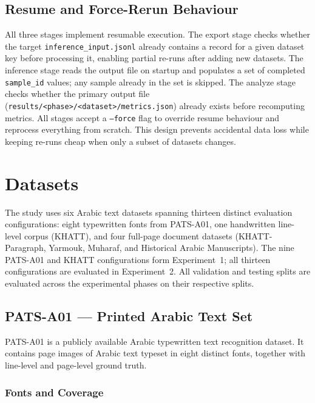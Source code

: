 \subsection{Resume and Force-Rerun Behaviour}
\label{subsec:resume}

All three stages implement resumable execution.
The export stage checks whether the target \texttt{inference\_input.jsonl} already
contains a record for a given dataset key before processing it, enabling partial
re-runs after adding new datasets.
The inference stage reads the output file on startup and populates a set of
completed \texttt{sample\_id} values; any sample already in the set is skipped.
The analyze stage checks whether the primary output file
(\texttt{results/<phase>/<dataset>/metrics.json}) already exists before
recomputing metrics.
All stages accept a \texttt{--force} flag to override resume behaviour and
reprocess everything from scratch.
This design prevents accidental data loss while keeping re-runs cheap when only
a subset of datasets changes.

\section{Datasets}
\label{sec:datasets}

The study uses six Arabic text datasets spanning thirteen distinct evaluation
configurations: eight typewritten fonts from PATS-A01, one handwritten
line-level corpus (KHATT), and four full-page document datasets
(KHATT-Paragraph, Yarmouk, Muharaf, and Historical Arabic Manuscripts).
The nine PATS-A01 and KHATT configurations form Experiment~1; all thirteen
configurations are evaluated in Experiment~2. All validation and testing splits
are evaluated across the experimental phases on their respective splits.

\subsection{PATS-A01 --- Printed Arabic Text Set}
\label{subsec:pats}

PATS-A01 is a publicly available Arabic typewritten text recognition dataset.
It contains page images of Arabic text typeset in eight distinct fonts, together
with line-level and page-level ground truth.

\subsubsection{Fonts and Coverage}

